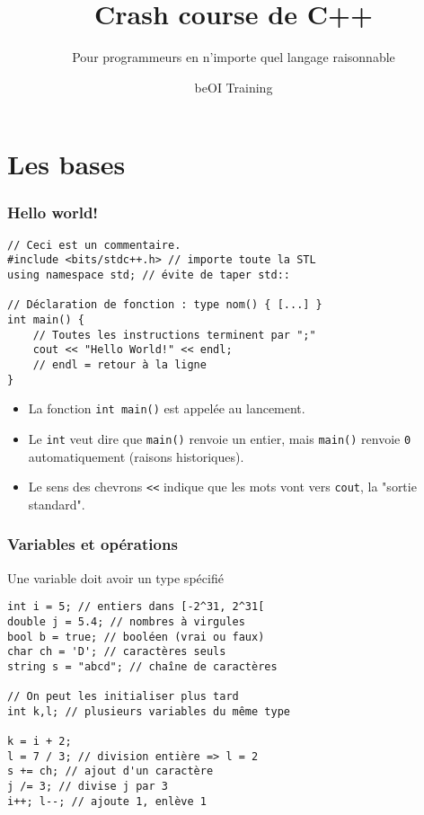 \documentclass[12pt]{beamer}
\title{Crash course de C++}
\subtitle{Pour programmeurs en n'importe quel langage raisonnable}
\author{beOI Training}
\institute{\texttt{[image: ../share/beoi-logo]}}
\date{}
\begin{document}
\maketitle


\section{Les bases}
\begin{frame}[fragile]
\frametitle{Hello world!}
\begin{lstlisting}
// Ceci est un commentaire.
#include <bits/stdc++.h> // importe toute la STL
using namespace std; // évite de taper std::

// Déclaration de fonction : type nom() { [...] }
int main() {
    // Toutes les instructions terminent par ";"
    cout << "Hello World!" << endl;
    // endl = retour à la ligne
}
\end{lstlisting}
\begin{itemize}
\item La fonction \lstinline|int main()| est appelée au lancement.
\item Le \lstinline|int| veut dire que \lstinline|main()| renvoie un entier, mais \lstinline|main()| renvoie \lstinline|0| automatiquement (raisons historiques).
\item Le sens des chevrons \lstinline|<<| indique que les mots vont vers \lstinline|cout|, la "sortie standard".
\end{itemize}
\end{frame}

\begin{frame}[fragile]
\frametitle{Variables et opérations}
Une variable doit avoir un type spécifié
\begin{lstlisting}
int i = 5; // entiers dans [-2^31, 2^31[
double j = 5.4; // nombres à virgules
bool b = true; // booléen (vrai ou faux)
char ch = 'D'; // caractères seuls
string s = "abcd"; // chaîne de caractères

// On peut les initialiser plus tard
int k,l; // plusieurs variables du même type

k = i + 2;
l = 7 / 3; // division entière => l = 2
s += ch; // ajout d'un caractère
j /= 3; // divise j par 3
i++; l--; // ajoute 1, enlève 1
\end{lstlisting}
\end{frame}
\end{document}
